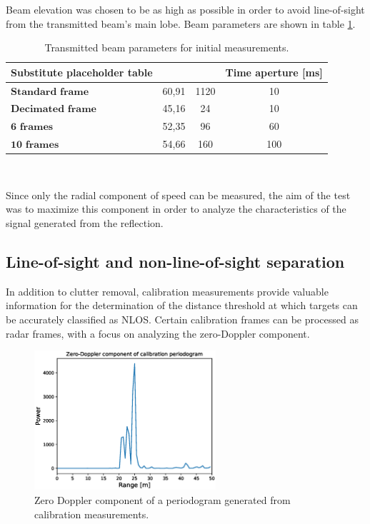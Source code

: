 Beam elevation was chosen to be as high as possible in order to avoid line-of-sight from the transmitted beam's main lobe. Beam parameters are shown in table \ref{table:Test1TXBeamParams}.


\begin{table}[H]
	\centering 
	\begin{tabular}{|p{9em} c c c |}
		\hline
		\rowcolor{bluepoli!40} %
		\textbf{Substitute placeholder table} & \textbf{} & \textbf{} & \textbf{Time aperture [ms]} \T\B \\
		\hline \hline
		$\textbf{Standard frame}$ & 60,91 & 1120 & 10 \T\B \\
		$\textbf{Decimated frame}$ & 45,16 & 24 & 10 \T\B\\
		$\textbf{6 frames}$ & 52,35 & 96 & 60  \T\B\\
		$\textbf{10 frames}$ & 54,66 & 160 & 100  \T\B\\
		
		\hline
	\end{tabular}
	\\[10pt]
	\caption{Transmitted beam parameters for initial measurements.}
	\label{table:Test1TXBeamParams}
\end{table}

Since only the radial component of speed can be measured, the aim of the test was to maximize this component in order to analyze the characteristics of the signal generated from the reflection.

\subsection{Line-of-sight and non-line-of-sight separation}

In addition to clutter removal, calibration measurements provide valuable information for the determination of the distance threshold at which targets can be accurately classified as NLOS. Certain calibration frames can be processed as radar frames, with a focus on analyzing the zero-Doppler component.
	

\begin{figure}[H]
	\centering
	\includegraphics[width=0.6\textwidth]{Images/Test1/cali_static_per_t1.eps}
	\caption{Zero Doppler component of a periodogram generated from calibration measurements.}
	\label{fig:Test1_cali_static_per}
\end{figure}

